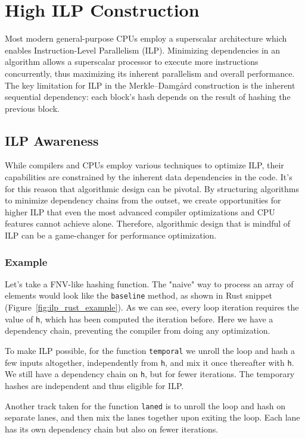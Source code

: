 \documentclass[10pt]{article}
\begin{document}
\clearpage
\section{High ILP Construction} \label{highilp}

Most modern general-purpose CPUs employ a superscalar architecture which enables Instruction-Level Parallelism (ILP). 
Minimizing dependencies in an algorithm allows a superscalar processor to execute more instructions concurrently, thus maximizing its inherent parallelism and overall performance.
The key limitation for ILP in the Merkle–Damgård construction is the inherent sequential dependency: each block's hash depends on the result of hashing the previous block.

\subsection{ILP Awareness}

While compilers and CPUs employ various techniques to optimize ILP, their capabilities are constrained by the inherent data dependencies in the code. It's for this reason that algorithmic design can be pivotal. By structuring algorithms to minimize dependency chains from the outset, we create opportunities for higher ILP that even the most advanced compiler optimizations and CPU features cannot achieve alone. Therefore, algorithmic design that is mindful of ILP can be a game-changer for performance optimization.

\subsubsection{Example}
Let's take a FNV-like hashing function. The "naive" way to process an array of elements would look like the \texttt{baseline} method, as shown in Rust snippet (Figure~\ref{fig:ilp_rust_example}). As we can see, every loop iteration requires the value of \texttt{h}, which has been computed the iteration before. Here we have a dependency chain, preventing the compiler from doing any optimization.

To make ILP possible, for the function \texttt{temporal} we unroll the loop and hash a few inputs altogether, independently from \texttt{h}, and mix it once thereafter with \texttt{h}. We still have a dependency chain on \texttt{h}, but for fewer iterations.
The temporary hashes are independent and thus eligible for ILP.

Another track taken for the function \texttt{laned} is to unroll the loop and hash on separate lanes, and then mix the lanes together upon exiting the loop. Each lane has its own dependency chain but also on fewer iterations.
\end{document}
